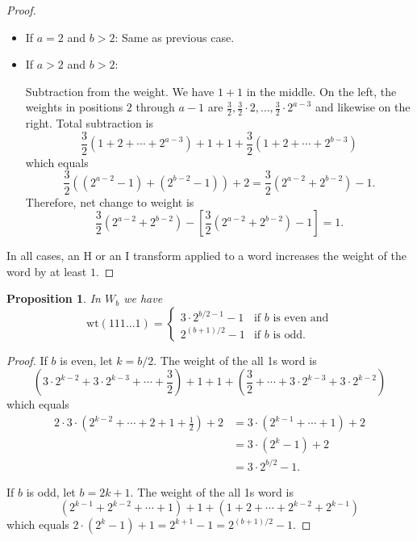 \documentclass[12pt]{article}
\newtheorem{prop}[conj]{Proposition}
\newcommand{\weight}[1]{\mathrm{wt}(#1)}
\begin{document}
\begin{proof}
\begin{itemize}
\begin{itemize}
    \item If $a=2$ and $b>2$: Same as previous case.

    \item If $a>2$ and $b>2$:


    Subtraction from the weight. We have $1+1$ in the middle.
    On the left, the weights in positions $2$ through $a-1$ are
    $\frac32, \frac32\cdot2, \ldots, \frac32 \cdot2^{a-3}$ and
    likewise on the right. Total subtraction is
    \[
    \frac32\left(1+2+\cdots+2^{a-3}\right) + 1 + 1 +
    \frac32\left(1+2+\cdots+2^{b-3}\right)
    \]
    which equals
    \[
    \frac32\left((2^{a-2}-1)  + (2^{b-2}-1)\right) + 2 
    =
    \frac32\left(2^{a-2} + 2^{b-2}\right) -1 .
    \]
    Therefore, net change to weight is
    \[
    \frac32\left(2^{a-2}+2^{b-2}\right) - \left[
      \frac32\left(2^{a-2} + 2^{b-2}\right) -1 
    \right] = 1.
    \]
    \end{itemize}
    

  \end{itemize}

  In all cases, an H or an I transform applied to a word increases the
  weight of the word by at least $1$.
\end{proof}


\begin{prop}
  In $W_b$ we have
  \[
  \weight{111\ldots1} =  
  \begin{cases}
    3\cdot 2^{b/2-1}-1 & \text{if $b$ is even and} \\
    2^{(b+1)/2}-1 & \text{if $b$ is odd}.
  \end{cases}
  \]
\end{prop}

\begin{proof}
  If $b$ is even, let $k=b/2$. The weight of the all 1s word is
  \[
  \left(3\cdot 2^{k-2} + 3\cdot 2^{k-3} + \cdots + \frac32\right) + 1 
  + 
  1 + \left( \frac32 + \cdots + 3\cdot 2^{k-3} + 3\cdot 2^{k-2}\right)
  \]
  which equals 
  \[
  \begin{aligned}
    2\cdot3\cdot(2^{k-2} + \cdots +2+ 1 + \tfrac12) + 2    
    &= 3 \cdot(2^{k-1} + \cdots + 1) + 2 \\
    &= 3 \cdot (2^{k} -1) + 2 \\
    &= 3 \cdot 2^{b/2} - 1.
  \end{aligned}
  \]

  If $b$ is odd, let $b=2k+1$. The weight of the all 1s word is
  \[
  \left(2^{k-1}+2^{k-2}+\cdots+1\right) + 1 + 
  \left(1 + 2 + \cdots + 2^{k-2}+2^{k-1}\right)
  \]
  which equals $2\cdot(2^k-1) + 1 = 2^{k+1}-1 = 2^{(b+1)/2}-1$.
\end{proof}
\end{document}
